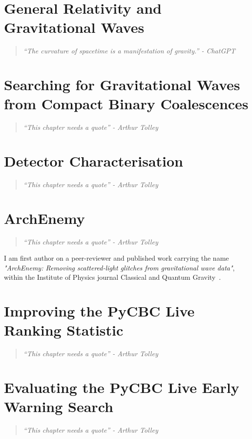 \documentclass[12pt,twoside]{report} %
\newcommand{\chapterquote}[1]{
  \begin{quote}
    \color{mediumgray}\itshape #1
  \end{quote}
}
\begin{document}
\chapter[General Relativity and Gravitational Waves]{General Relativity and Gravitational Waves}
\chapterquote{``The curvature of spacetime is a manifestation of gravity.'' - ChatGPT}


\chapter[Searching for Gravitational Waves from Compact Binary Coalescences]{Searching for Gravitational Waves from Compact Binary Coalescences}
\chapterquote{``This chapter needs a quote'' - Arthur Tolley}


\chapter[Detector Characterisation]{Detector Characterisation}\chapterquote{``This chapter needs a quote'' - Arthur Tolley}


\chapter[ArchEnemy]{ArchEnemy}
\chapterquote{``This chapter needs a quote'' - Arthur Tolley}
I am first author on a peer-reviewer and published work carrying the name \textit{"ArchEnemy: Removing scattered-light glitches from gravitational wave data"}, within the Institute of Physics journal Classical and Quantum Gravity~\cite{ArchEnemy:2023}.


\chapter[Improving the PyCBC Live Ranking Statistic]{Improving the PyCBC Live Ranking Statistic}
\chapterquote{``This chapter needs a quote'' - Arthur Tolley}


\chapter[Evaluating the PyCBC Live Early Warning Search]{Evaluating the PyCBC Live Early Warning Search}
\chapterquote{``This chapter needs a quote'' - Arthur Tolley}

\end{document}
